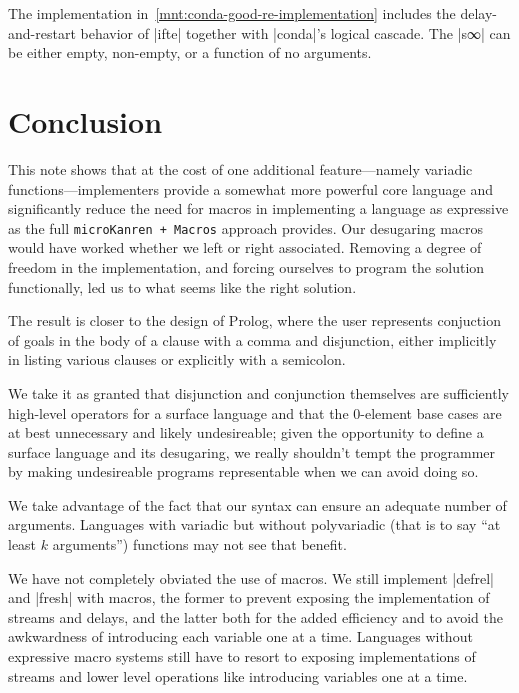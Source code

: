 \documentclass[sigplan,screen,draft,anonymous,review,natbib=false]{acmart}
\begin{document}
The implementation in~\cref{mnt:conda-good-re-implementation} includes
the delay-and-restart behavior of \rackinline|ifte| together with
\rackinline|conda|'s logical cascade. The \rackinline|s∞| can be
either empty, non-empty, or a function of no arguments.

\section{Conclusion}\label{sec:conclusion}

This note shows that at the cost of one additional feature---namely
variadic functions---implementers provide a somewhat more powerful
core language and significantly reduce the need for macros in
implementing a language as expressive as the full
\verb|microKanren + Macros| approach provides. Our desugaring macros
would have worked whether we left or right associated. Removing a
degree of freedom in the implementation, and forcing ourselves to
program the solution functionally, led us to what seems like the right
solution.

The result is closer to the design of Prolog, where the user
represents conjuction of goals in the body of a clause with a comma
and disjunction, either implicitly in listing various clauses or
explicitly with a semicolon.

We take it as granted that disjunction and conjunction themselves are
sufficiently high-level operators for a surface language and that the
0-element base cases are at best unnecessary and likely undesireable;
given the opportunity to define a surface language and its desugaring,
we really shouldn't tempt the programmer by making undesireable
programs representable when we can avoid doing so.

We take advantage of the fact that our syntax can ensure an
adequate number of arguments. Languages with variadic but without
polyvariadic (that is to say \enquote{at least $k$ arguments})
functions may not see that benefit.

We have not completely obviated the use of macros. We still implement
\rackinline|defrel| and \rackinline|fresh| with macros, the former to
prevent exposing the implementation of streams and delays, and the
latter both for the added efficiency and to avoid the awkwardness of
introducing each variable one at a time. Languages without expressive
macro systems still have to resort to exposing implementations of
streams and lower level operations like introducing
variables one at a time.
\end{document}
